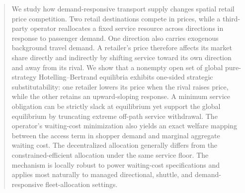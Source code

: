 \begin{abstract}
We study how demand-responsive transport supply changes spatial retail price competition. Two retail destinations compete in prices, while a third-party operator reallocates a fixed service resource across directions in response to passenger demand. One direction also carries exogenous background travel demand. A retailer's price therefore affects its market share directly and indirectly by shifting service toward its own direction and away from its rival. We show that a nonempty open set of global pure-strategy Hotelling--Bertrand equilibria exhibits one-sided strategic substitutability: one retailer lowers its price when the rival raises price, while the other retains an upward-sloping response. A minimum service obligation can be strictly slack at equilibrium yet support the global equilibrium by truncating extreme off-path service withdrawal. The operator's waiting-cost minimization also yields an exact welfare mapping between the access term in shopper demand and marginal aggregate waiting cost. The decentralized allocation generally differs from the constrained-efficient allocation under the same service floor. The mechanism is locally robust to power waiting-cost specifications and applies most naturally to managed directional, shuttle, and demand-responsive fleet-allocation settings.
\end{abstract}
